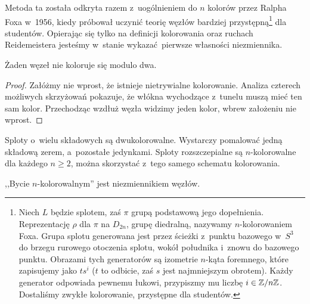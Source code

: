 Metoda ta została odkryta razem z~uogólnieniem do $n$ kolorów przez Ralpha Foxa w~1956, kiedy próbował uczynić teorię węzłów bardziej przystępną\footnote{
	Niech $L$ będzie splotem, zaś $\pi$ grupą podstawową jego dopełnienia.
	Reprezentację $\rho$ dla $\pi$ na $D_{2n}$, grupę diedralną, nazywamy $n$-kolorowaniem Foxa.
	Grupa splotu generowana jest przez ścieżki z~punktu bazowego w~$S^3$ do brzegu rurowego otoczenia splotu, wokół południka i~znowu do bazowego punktu.
	Obrazami tych generatorów są izometrie $n$-kąta foremnego, które zapisujemy jako $ts^i$ ($t$ to odbicie, zaś $s$ jest najmniejszym obrotem).
	Każdy generator odpowiada pewnemu łukowi, przypiszmy mu liczbę $i \in \mathbb Z/n\mathbb Z$.
	Dostaliśmy zwykłe kolorowanie, przystępne dla studentów.
}
dla studentów.
Opierając się tylko na definicji kolorowania oraz ruchach Reidemeistera jesteśmy w~stanie wykazać pierwsze własności niezmiennika.

\begin{proposition}
	Żaden węzeł nie koloruje się modulo dwa.
\end{proposition}

\begin{proof}
	Załóżmy nie wprost, że istnieje nietrywialne kolorowanie.
	Analiza czterech możliwych skrzyżowań pokazuje,
	że włókna wychodzące z~tunelu muszą mieć ten sam kolor.
	Przechodząc wzdłuż węzła widzimy jeden kolor, wbrew założeniu nie wprost.
\end{proof}

Sploty o~wielu składowych są dwukolorowalne.
Wystarczy pomalować jedną składową zerem, a~pozostałe jedynkami.
Sploty rozszczepialne są $n$-kolorowalne dla każdego $n \ge 2$, można skorzystać z~tego samego schematu kolorowania.

\begin{proposition} \label{color_invariant}
	,,Bycie $n$-kolorowalnym'' jest niezmiennikiem węzłów.
\end{proposition}

